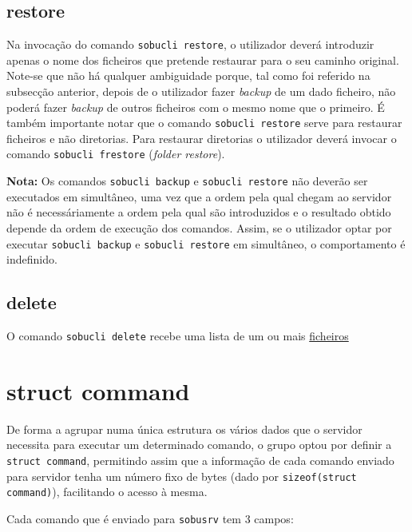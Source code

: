 \documentclass[a4paper,12pt,titlepage,portuguese]{article}
\begin{document}
\subsection{restore}

Na invocação do comando \texttt{sobucli restore}, o utilizador deverá introduzir apenas o nome dos ficheiros que pretende restaurar para o seu caminho original. Note-se que não há qualquer ambiguidade porque, tal como foi referido na subsecção anterior, depois de o utilizador fazer \emph{backup} de um dado ficheiro, não poderá fazer \emph{backup} de outros ficheiros com o mesmo nome que o primeiro. É também importante notar que o comando \texttt{sobucli restore} serve para restaurar ficheiros e não diretorias. Para restaurar diretorias o utilizador deverá invocar o comando \texttt{sobucli frestore} (\emph{folder restore}).

\textbf{Nota:} Os comandos \texttt{sobucli backup} e \texttt{sobucli restore} não deverão ser executados em simultâneo, uma vez que a ordem pela qual chegam ao servidor não é necessáriamente a ordem pela qual são introduzidos e o resultado obtido depende da ordem de execução dos comandos. Assim, se o utilizador optar por executar \texttt{sobucli backup} e \texttt{sobucli restore} em simultâneo, o comportamento é indefinido.

\subsection{delete}

O comando \texttt{sobucli delete} recebe uma lista de um ou mais \underline{ficheiros}

\section{struct command}

De forma a agrupar numa única estrutura os vários dados que o servidor necessita para executar um determinado comando, o grupo optou por definir a \texttt{struct command}, permitindo assim que a informação de cada comando enviado para servidor tenha um número fixo de bytes (dado por \texttt{sizeof(struct command)}), facilitando o acesso à mesma. 

Cada comando que é enviado para \texttt{sobusrv} tem 3 campos:
\end{document}
